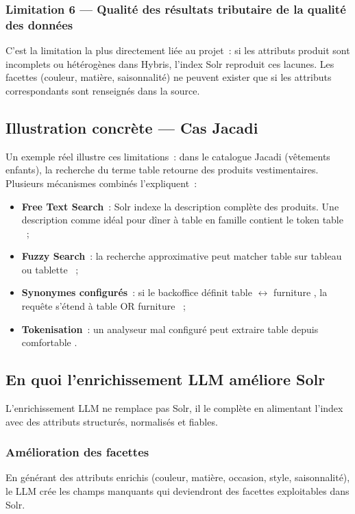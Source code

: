 \subsubsection{Limitation 6 — Qualité des résultats tributaire de la qualité des données}
C'est la limitation la plus directement liée au projet~: si les attributs produit sont incomplets ou hétérogènes dans Hybris, l'index Solr reproduit ces lacunes. Les facettes (couleur, matière, saisonnalité) ne peuvent exister que si les attributs correspondants sont renseignés dans la source.

\subsection{Illustration concrète — Cas Jacadi}
Un exemple réel illustre ces limitations~: dans le catalogue Jacadi (vêtements enfants), la recherche du terme \og table \fg{} retourne des produits vestimentaires. Plusieurs mécanismes combinés l'expliquent~:

\begin{itemize}
  \item \textbf{Free Text Search}~: Solr indexe la description complète des produits. Une description comme \og idéal pour dîner à table en famille \fg{} contient le token \og table \fg{}~;
  \item \textbf{Fuzzy Search}~: la recherche approximative peut matcher \og table \fg{} sur \og tableau \fg{} ou \og tablette \fg{}~;
  \item \textbf{Synonymes configurés}~: si le backoffice définit \og table $\leftrightarrow$ furniture \fg{}, la requête s'étend à \og table OR furniture \fg{}~;
  \item \textbf{Tokenisation}~: un analyseur mal configuré peut extraire \og table \fg{} depuis \og comfortable \fg{}.
\end{itemize}

\subsection{En quoi l'enrichissement LLM améliore Solr}
L'enrichissement LLM ne remplace pas Solr, il le complète en alimentant l'index avec des attributs structurés, normalisés et fiables.

\subsubsection{Amélioration des facettes}
En générant des attributs enrichis (couleur, matière, occasion, style, saisonnalité), le LLM crée les champs manquants qui deviendront des facettes exploitables dans Solr.


